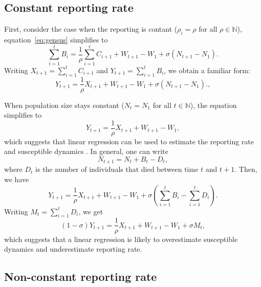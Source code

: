 \documentclass{article}
\begin{document}
\subsection*{Constant reporting rate}

First, consider the case when the reporting is contant ($\rho_i = \rho$ for all $\rho \in \mathbb{N}$), equation~\ref{eq:gensus} simplifies to 
\begin{equation}
\sum_{i=1}^t B_i = \frac{1}{\rho} \sum_{i=1}^t C_{i+1} + W_{t+1} - W_1 + \sigma (N_{t+1} - N_1).
\end{equation}
Writing $X_{t+1} = \sum_{i=1}^t C_{i+1}$ and $Y_{t+1} = \sum_{i=1}^t B_i$, we obtain a familiar form:
\begin{equation}
Y_{t+1} = \frac{1}{\rho} X_{t+1} + W_{t+1} - W_1 + \sigma (N_{t+1} - N_1).,
\end{equation}

When population size stays constant ($N_{t} = N_1$ for all $t \in \mathbb{N}$), the equation simplifies to 
\begin{equation}
Y_{t+1} = \frac{1}{\rho} X_{t+1} + W_{t+1} - W_1,
\end{equation}
which suggests that linear regression can be used to estimate the reporting rate and susceptible dynamics \citep{finkenstadt2000time}.
In general, one can write
$$
N_{t+1} = N_t + B_t - D_t,
$$
where $D_t$ is the number of individuals that died between time $t$ and $t+1$.
Then, we have
\begin{equation}
Y_{t+1} = \frac{1}{\rho} X_{t+1} + W_{t+1} - W_1 + \sigma \left(\sum_{i=1}^t B_i - \sum_{i=1}^t D_i \right).
\end{equation}
Writing $M_t =  \sum_{i=1}^t D_i$, we get
\begin{equation}
(1 - \sigma) Y_{t+1} = \frac{1}{\rho} X_{t+1} + W_{t+1} - W_1 + \sigma M_t,
\end{equation}
which suggests that a linear regression is likely to overestimate susceptible dynamics and underestimate reporting rate.

\subsection*{Non-constant reporting rate}
\end{document}
